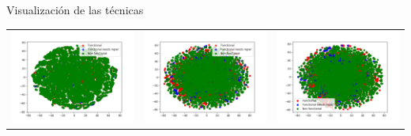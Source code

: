 \begin{frame}{Visualización de las técnicas}
	\begin{tabular}{ccc}
		\includegraphics[scale=0.21]{./figures/knn/raw_2d.png} & \includegraphics[scale=0.21]{./figures/knn/scaled_2d.png} & \includegraphics[scale=0.21]{./figures/knn/PCA_2d.png} \\

\end{tabular}
\end{frame}
